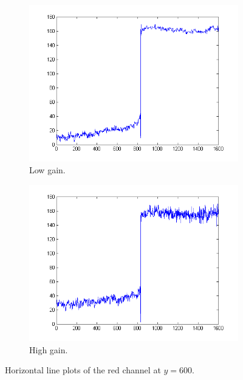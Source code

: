 \documentclass[a4paper, 12pt]{paper}
\begin{document}
\begin{figure}[H]
    \centering
    \begin{subfigure}[b]{0.47\textwidth}
        \includegraphics[width=\textwidth]{img/plot_contrast_no_gain}
        \caption{Low gain.}
    \end{subfigure}
    \begin{subfigure}[b]{0.47\textwidth}
        \includegraphics[width=\textwidth]{img/plot_contrast_max_gain}
        \caption{High gain.}
    \end{subfigure}
    \caption{Horizontal line plots of the red channel at $y = 600$.}
\label{fig:step_line}
\end{figure}
\end{document}
